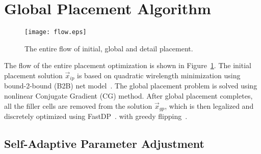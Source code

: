 \documentclass[conference,10pt]{IEEEtran}
\begin{document}
\section{Global Placement Algorithm}
\label{sec:gp}
\vspace{-0.05in}

\begin{figure}[http]
\centering
\texttt{[image: flow.eps]}
\caption{The entire flow of initial, global and detail placement.}
\label{fig:flow01}
\end{figure}



The flow of the entire placement optimization is shown 
in Figure~\ref{fig:flow01}.
The initial placement solution $\vec{x}_{ip}$ is based on 
quadratic wirelength minimization 
using bound-2-bound (B2B) net model~\cite{kw2}.
The global placement problem is solved 
using nonlinear Conjugate Gradient (CG) method.
After global placement completes, 
all the filler cells are removed from the 
solution $\vec{x}_{gp}$, which is then legalized 
and discretely optimized
using FastDP~\cite{fastdp}.
with greedy flipping~\cite{capo}.


\subsection{Self-Adaptive Parameter Adjustment}
\label{subsec:gp_par}
\end{document}
